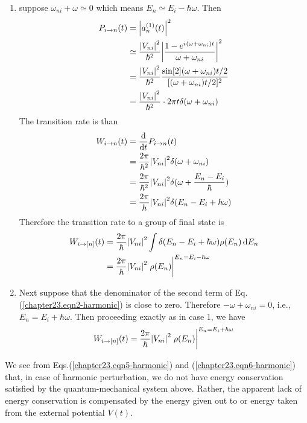 \begin{enumerate} [start=0,label={(case \arabic*):}]
	\item suppose $\omega_{n i} + \omega \simeq 0$ which means $E_n \simeq E_i - \hbar \omega$.
	Then
\begin{align*}
	P_{i \rightarrow n}(t) 
	&= \abs{a_n^{(1)}(t)}^2 \\
	&\simeq \frac{\abs{V_{n i}}^2}{\hbar^2} \abs{\frac{1 - e^{{i\mkern1mu} (\omega + \omega_{n i})t}}{\omega + \omega_{n i}}}^2 \\
	&= \frac{\abs{V_{n i}}^2}{\hbar^2} \frac{\sin[2]{(\omega + \omega_{n i})t/2}}{[(\omega + \omega_{n i})t/2]^2} \\
	&= \frac{\abs{V_{n i}}^2}{\hbar^2} \cdot 2 \pi t \delta(\omega + \omega_{n i})
\end{align*}
	The transition rate is than
	\begin{align*}
	W_{i \rightarrow n}(t) 
	&= \dv{}{t} P_{i \rightarrow n}(t) \\
	&= \frac{2 \pi}{\hbar^2}  \abs{V_{n i}}^2 \delta(\omega + \omega_{n i}) \\
	&= \frac{2 \pi}{\hbar^2}  \abs{V_{n i}}^2 \delta(\omega + \frac{E_n - E_i}{\hbar}) \\
	&= \frac{2 \pi}{\hbar}  \abs{V_{n i}}^2 \delta(E_n - E_i + \hbar\omega)
	\end{align*}
	Therefore the transition rate to a group of final state is
	\begin{align}
		W_{i \rightarrow [n]}(t)
		&= \frac{2 \pi}{\hbar}  \abs{V_{n i}}^2 \int \delta(E_n - E_i + \hbar\omega)\rho(E_n) \dd{E_n} \nonumber\\
		\label{chapter23.eqn5-harmonic}
		&= \frac{2 \pi}{\hbar}  \abs{V_{n i}}^2 \eval{\rho(E_n)}_{}^{E_n = E_i - \hbar\omega}
	\end{align}
	
	\item Next suppose that the denominator of the second term of Eq. (\ref{chapter23.eqn2-harmonic}) is close to zero. Therefore $-\omega + \omega_{n i} = 0$, i.e., $E_n = E_i + \hbar\omega$. Then proceeding exactly as in case $1$, we have
	\begin{equation}
	\label{chapter23.eqn6-harmonic}
	W_{i \rightarrow [n]}(t)
	= \frac{2 \pi}{\hbar}  \abs{V_{n i}}^2 \eval{\rho(E_n)}_{}^{E_n = E_i + \hbar\omega}
	\end{equation}
\end{enumerate}
We see from Eqs.(\ref{chapter23.eqn5-harmonic}) and (\ref{chapter23.eqn6-harmonic}) that, in case of harmonic perturbation, we do not have energy conservation satisfied by the quantum-mechanical system above. Rather, the apparent lack of energy conservation is compensated by the energy given out to or energy taken from the external potential $V(t)$.

